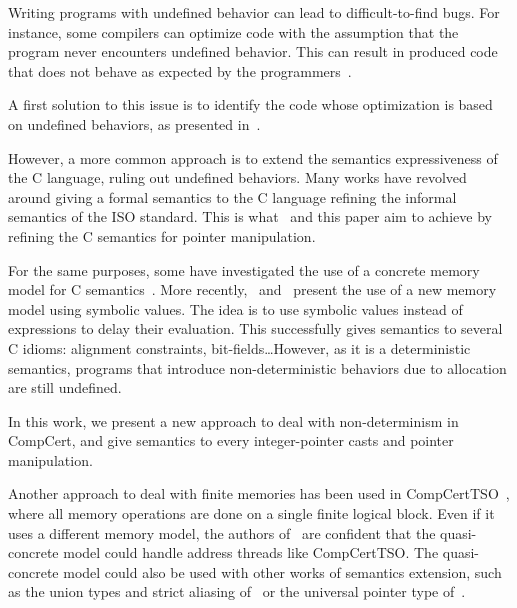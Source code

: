 Writing programs with undefined behavior can lead to difficult-to-find bugs.
For instance, some compilers can optimize code with the assumption that the program never encounters undefined behavior. This can result in produced code that does not behave as expected by the programmers~\cite{DBLP:conf/apsys/WangCCJZK12}.

A first solution to this issue is to identify the code whose optimization is based on undefined behaviors, as presented in~\cite{DBLP:conf/sosp/WangZKS13}.

However, a more common approach is to extend the semantics expressiveness of the C language, ruling out undefined behaviors.
Many works have revolved around giving a formal semantics to the C language refining the informal semantics of the ISO standard.
This is what~\cite{DBLP:conf/pldi/KangHMGZV15} and this paper aim to achieve by refining the C semantics for pointer manipulation.

For the same purposes, some have investigated the use of a concrete memory model for C semantics~\cite{DBLP:conf/popl/TuchKN07}\cite{Norrish98cformalised}.
More recently,~\cite{besson:hal-01093312} and~\cite{DBLP:conf/itp/BessonBW15} present the use of a new memory model using symbolic values. The idea is to use symbolic values instead of expressions to delay their evaluation. This successfully gives semantics to several C idioms: alignment constraints, bit-fields\dots However, as it is a deterministic semantics, programs that introduce non-deterministic behaviors due to allocation are still undefined.

In this work, we present a new approach to deal with non-determinism in CompCert, and give semantics to every integer-pointer casts and pointer manipulation.

Another approach to deal with finite memories has been used in CompCertTSO~\cite{DBLP:journals/jacm/SevcikVNJS13}, where all memory operations are done on a single finite logical block. Even if it uses a different memory model, the authors of~\cite{DBLP:conf/pldi/KangHMGZV15} are confident that the quasi-concrete model could handle address threads like CompCertTSO.
The quasi-concrete model could also be used with other works of semantics extension, such as the union types and strict aliasing of~\cite{DBLP:conf/cpp/Krebbers13} or the universal pointer type of~\cite{DBLP:conf/itp/KrebbersLW14}.
